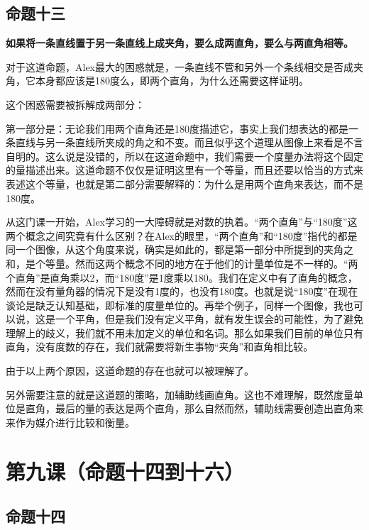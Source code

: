 \documentclass[
]{book}
\begin{document}
\hypertarget{ux547dux9898ux5341ux4e09}{%
\section{命题十三}\label{ux547dux9898ux5341ux4e09}}

\textbf{如果将一条直线置于另一条直线上成夹角，要么成两直角，要么与两直角相等。}

对于这道命题，Alex最大的困惑就是，一条直线不管和另外一个条线相交是否成夹角，它本身都应该是180度么，即两个直角，为什么还需要这样证明。

这个困惑需要被拆解成两部分：

第一部分是：无论我们用两个直角还是180度描述它，事实上我们想表达的都是一条直线与另一条直线所夹成的角之和不变。而且似乎这个道理从图像上来看是不言自明的。这么说是没错的，所以在这道命题中，我们需要一个度量办法将这个固定的量描述出来。这道命题不仅仅是证明这里有一个等量，而且还要以恰当的方式来表述这个等量，也就是第二部分需要解释的：为什么是用两个直角来表达，而不是180度。

从这门课一开始，Alex学习的一大障碍就是对数的执着。``两个直角''与``180度''这两个概念之间究竟有什么区别？在Alex的眼里，``两个直角''和``180度''指代的都是同一个图像，从这个角度来说，确实是如此的，都是第一部分中所提到的夹角之和，是个等量。然而这两个概念不同的地方在于他们的计量单位是不一样的。``两个直角''是直角乘以2，而``180度''是1度乘以180。我们在定义中有了直角的概念，然而在没有量角器的情况下是没有1度的，也没有180度。也就是说``180度''在现在谈论是缺乏认知基础，即标准的度量单位的。再举个例子，同样一个图像，我也可以说，这是一个平角，但是我们没有定义平角，就有发生误会的可能性，为了避免理解上的歧义，我们就不用未加定义的单位和名词。那么如果我们目前的单位只有直角，没有度数的存在，我们就需要将新生事物``夹角''和直角相比较。

由于以上两个原因，这道命题的存在也就可以被理解了。

另外需要注意的就是这道题的策略，加辅助线画直角。这也不难理解，既然度量单位是直角，最后的量的表达是两个直角，那么自然而然，辅助线需要创造出直角来来作为媒介进行比较和衡量。

\hypertarget{ux7b2cux4e5dux8bfeux547dux9898ux5341ux56dbux5230ux5341ux516d}{%
\chapter{第九课（命题十四到十六）}\label{ux7b2cux4e5dux8bfeux547dux9898ux5341ux56dbux5230ux5341ux516d}}

\hypertarget{ux547dux9898ux5341ux56db}{%
\section{命题十四}\label{ux547dux9898ux5341ux56db}}
\end{document}
